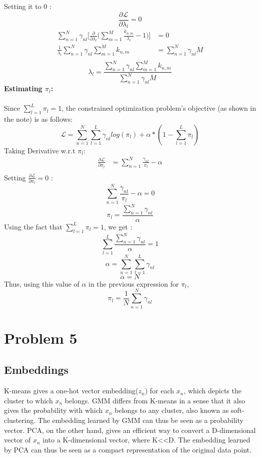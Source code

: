 \documentclass{article}
\begin{document}
Setting it to 0 :
$$\frac{\partial \mathcal{L}}{\partial \lambda_l} =  0 $$
\begin{equation*}
\begin{aligned}
\sum_{n=1}^N\gamma_{nl}\Bigg[\frac{\partial}{\partial \lambda_l} \bigg(\sum_{m=1}^M \frac{k_{n,m}}{\lambda_l} - 1 \bigg)\Bigg]  &= 0\\
\frac{1}{\lambda_l}\sum_{n=1}^N \gamma_{nl}\sum_{m=1}^M k_{n,m} &= \sum_{n=1}^N \gamma_{nl}M \\
\end{aligned}
\end{equation*}
$$\lambda_l = \frac{\sum_{n=1}^N \gamma_{nl}\sum_{m=1}^M k_{n,m}}{\sum_{n=1}^N \gamma_{nl}M} $$
\textbf{Estimating $\pi_l$: }\\ \\
Since $\sum_{l=1}^L\pi_l = 1$, the constrained optimization problem's objective (as shown in the note) is as follows:
$$\mathcal{L} = \sum_{n=1}^N\sum_{l=1}^L\gamma_{nl} log(\pi_l) + \alpha*(1- \sum_{l=1}^L\pi_l)$$
Taking Derivative w.r.t $\pi_l$:
\begin{equation*}
\begin{aligned}
\frac{\partial \mathcal{L}}{\partial \pi_l} &= \sum_{n=1}^N \frac{\gamma_{nl}}{\pi_l} - \alpha \\ 
\end{aligned}
\end{equation*}
Setting $\frac{\partial \mathcal{L}}{\partial \pi_l}  = 0$ :
$$\sum_{n=1}^N \frac{\gamma_{nl}}{\pi_l} - \alpha  = 0$$
$$\pi_l = \frac{\sum_{n=1}^N \gamma_{nl}}{\alpha}$$
Using the fact that $\sum_{l=1}^L\pi_l = 1$, we get :
$$\sum_{l=1}^L\frac{\sum_{n=1}^N\gamma_{nl}}{\alpha} = 1$$
$$\alpha = \sum_{n=1}^N\sum_{l=1}^L \gamma_{nl}$$
$$\alpha = N$$
Thus, using this value of $\alpha$ in the previous expression for $\pi_l$,
$$\pi_l = \frac{1}{N} \sum_{n=1}^N \gamma_{nl }$$

\section{Problem 5}
\subsection{Embeddings}
K-means gives a one-hot vector embedding($z_n$) for each $x_n$, which depicts the cluster to which $x_n$ belongs. GMM differs from K-means in a sense that it also gives the probability with which $x_n$ belongs to any cluster, also known as soft-clustering. The embedding learned by GMM can thus be seen as a probability vector. PCA, on the other hand, gives an efficient way to convert a D-dimensional vector of $x_n$ into a K-dimensional vector, where K<<D. The embedding learned by PCA can thus be seen as a compact representation of the original data point.
\end{document}
